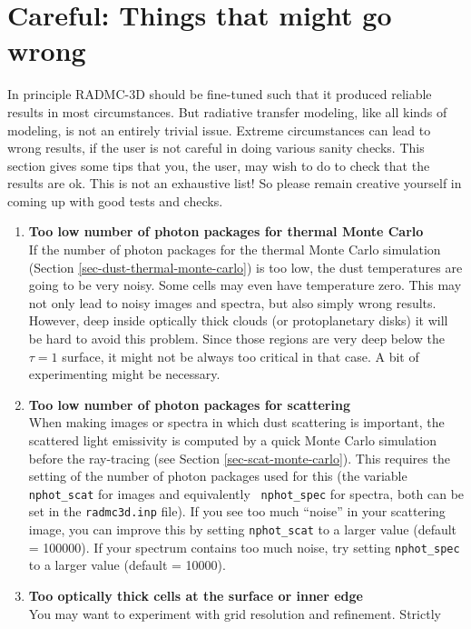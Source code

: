 \documentclass{report}
\begin{document}
\section{Careful: Things that might go wrong}
\label{sec-things-going-wrong}
%
In principle RADMC-3D should be fine-tuned such that it produced reliable
results in most circumstances. But radiative transfer modeling, like all
kinds of modeling, is not an entirely trivial issue. Extreme circumstances 
can lead to wrong results, if the user is not careful in doing various
sanity checks. This section gives some tips that you, the user, may wish
to do to check that the results are ok. This is not an exhaustive list!
So please remain creative yourself in coming up with good tests and checks.
\begin{enumerate}
\item {\bf Too low number of photon packages for thermal Monte Carlo}\\
  If the number of photon packages for the thermal Monte Carlo simulation
  (Section \ref{sec-dust-thermal-monte-carlo}) is too low, the dust
  temperatures are going to be very noisy. Some cells may even have
  temperature zero. This may not only lead to noisy images and spectra,
  but also simply wrong results. However, deep inside optically thick
  clouds (or protoplanetary disks) it will be hard to avoid this problem.
  Since those regions are very deep below the $\tau=1$ surface, it might
  not be always too critical in that case. A bit of experimenting might
  be necessary.
\item {\bf Too low number of photon packages for scattering}\\
  When making images or spectra in which dust scattering is important, the
  scattered light emissivity is computed by a quick Monte Carlo simulation
  before the ray-tracing (see Section \ref{sec-scat-monte-carlo}). This
  requires the setting of the number of photon packages used for this (the
  variable {\small\tt nphot\_scat} for images and equivalently {\small\tt
    nphot\_spec} for spectra, both can be set in the {\small\tt radmc3d.inp}
  file). If you see too much ``noise'' in your scattering image, you can
  improve this by setting {\small\tt nphot\_scat} to a larger value (default
  = 100000). If your spectrum contains too much noise, try setting
  {\small\tt nphot\_spec} to a larger value (default = 10000).
\item {\bf Too optically thick cells at the surface or inner edge}\\
  You may want to experiment with grid resolution and refinement. Strictly

\end{enumerate}
\end{document}
